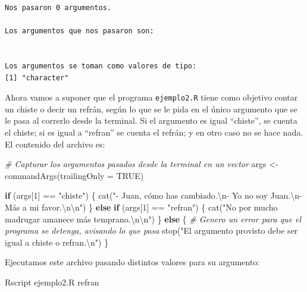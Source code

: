 \documentclass[
]{book}
\newenvironment{Shaded}{\begin{snugshade}}{\end{snugshade}}
\newcommand{\AttributeTok}[1]{\textcolor[rgb]{0.77,0.63,0.00}{#1}}
\newcommand{\CommentTok}[1]{\textcolor[rgb]{0.56,0.35,0.01}{\textit{#1}}}
\newcommand{\ConstantTok}[1]{\textcolor[rgb]{0.00,0.00,0.00}{#1}}
\newcommand{\ControlFlowTok}[1]{\textcolor[rgb]{0.13,0.29,0.53}{\textbf{#1}}}
\newcommand{\DecValTok}[1]{\textcolor[rgb]{0.00,0.00,0.81}{#1}}
\newcommand{\ExtensionTok}[1]{#1}
\newcommand{\FunctionTok}[1]{\textcolor[rgb]{0.00,0.00,0.00}{#1}}
\newcommand{\NormalTok}[1]{#1}
\newcommand{\OtherTok}[1]{\textcolor[rgb]{0.56,0.35,0.01}{#1}}
\newcommand{\SpecialCharTok}[1]{\textcolor[rgb]{0.00,0.00,0.00}{#1}}
\newcommand{\StringTok}[1]{\textcolor[rgb]{0.31,0.60,0.02}{#1}}
\begin{document}
\begin{verbatim}
Nos pasaron 0 argumentos.

Los argumentos que nos pasaron son:
 

Los argumentos se toman como valores de tipo:
[1] "character"
\end{verbatim}

Ahora vamos a suponer que el programa \texttt{ejemplo2.R} tiene como objetivo contar un chiste o decir un refrán, según lo que se le pida en el único argumento que se le pasa al correrlo desde la terminal. Si el argumento es igual ``chiste'', se cuenta el chiste; si es igual a ``refran'' se cuenta el refrán; y en otro caso no se hace nada. El contenido del archivo es:

\begin{Shaded}
\begin{Highlighting}[]
\CommentTok{\# Capturar los argumentos pasados desde la terminal en un vector}
\NormalTok{args }\OtherTok{\textless{}{-}} \FunctionTok{commandArgs}\NormalTok{(}\AttributeTok{trailingOnly =} \ConstantTok{TRUE}\NormalTok{)}

\ControlFlowTok{if}\NormalTok{ (args[}\DecValTok{1}\NormalTok{] }\SpecialCharTok{==} \StringTok{"chiste"}\NormalTok{) \{}
    \FunctionTok{cat}\NormalTok{(}\StringTok{"{-} Juan, cómo has cambiado.}\SpecialCharTok{\textbackslash{}n}\StringTok{{-} Yo no soy Juan.}\SpecialCharTok{\textbackslash{}n}\StringTok{{-} Más a mi favor.}\SpecialCharTok{\textbackslash{}n\textbackslash{}n}\StringTok{"}\NormalTok{)}
\NormalTok{\} }\ControlFlowTok{else} \ControlFlowTok{if}\NormalTok{ (args[}\DecValTok{1}\NormalTok{] }\SpecialCharTok{==} \StringTok{"refran"}\NormalTok{) \{}
    \FunctionTok{cat}\NormalTok{(}\StringTok{"No por mucho madrugar amanece más temprano.}\SpecialCharTok{\textbackslash{}n\textbackslash{}n}\StringTok{"}\NormalTok{)}
\NormalTok{\} }\ControlFlowTok{else}\NormalTok{ \{}
    \CommentTok{\# Genero un error para que el programa se detenga, avisando lo que pasa}
    \FunctionTok{stop}\NormalTok{(}\StringTok{"El argumento provisto debe ser igual a chiste o refran.}\SpecialCharTok{\textbackslash{}n}\StringTok{"}\NormalTok{)}
\NormalTok{\}}
\end{Highlighting}
\end{Shaded}

Ejecutamos este archivo pasando distintos valores para su argumento:

\begin{Shaded}
\begin{Highlighting}[]
\ExtensionTok{Rscript}\NormalTok{ ejemplo2.R refran}
\end{Highlighting}
\end{Shaded}
\end{document}
